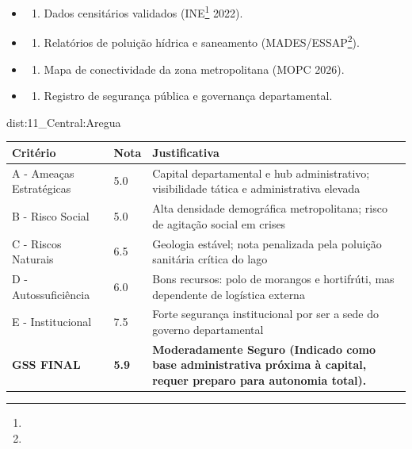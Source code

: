 {\begin{itemize}
\tightlist
\item
  \begin{enumerate}
  \def\labelenumi{\arabic{enumi})}
  \tightlist
  \item
    Dados censitários validados (INE\footnote{\fineINE} 2022).
  \end{enumerate}
\item
  \begin{enumerate}
  \def\labelenumi{\arabic{enumi})}
  \setcounter{enumi}{1}
  \tightlist
  \item
    Relatórios de poluição hídrica e saneamento (MADES/\allowbreak ESSAP\footnote{\fineESSAP}).
  \end{enumerate}
\item
  \begin{enumerate}
  \def\labelenumi{\arabic{enumi})}
  \setcounter{enumi}{2}
  \tightlist
  \item
    Mapa de conectividade da zona metropolitana (MOPC 2026).
  \end{enumerate}
\item
  \begin{enumerate}
  \def\labelenumi{\arabic{enumi})}
  \setcounter{enumi}{3}
  \tightlist
  \item
    Registro de segurança pública e governança departamental.
  \end{enumerate}
\end{itemize}}{dist:11_Central:Aregua}
\begin{table}[ht!]
\small \begin{tabular}{p{3.0cm}p{0.8cm}p{6.0cm}} \toprule
\textbf{Critério} & \textbf{Nota} & \textbf{Justificativa} \\ \midrule
A - Ameaças Estratégicas & 5.0 & Capital departamental e hub administrativo; visibilidade tática e administrativa elevada \\
B - Risco Social & 5.0 & Alta densidade demográfica metropolitana; risco de agitação social em crises \\
C - Riscos Naturais & 6.5 & Geologia estável; nota penalizada pela poluição sanitária crítica do lago \\
D - Autossuficiência & 6.0 & Bons recursos: polo de morangos e hortifrúti, mas dependente de logística externa \\
E - Institucional & 7.5 & Forte segurança institucional por ser a sede do governo departamental \\
\midrule \textbf{GSS FINAL} & \textbf{5.9} & \textbf{Moderadamente Seguro (Indicado como base administrativa próxima à capital, requer preparo para autonomia total).} \\ \bottomrule \end{tabular}
\end{table}
